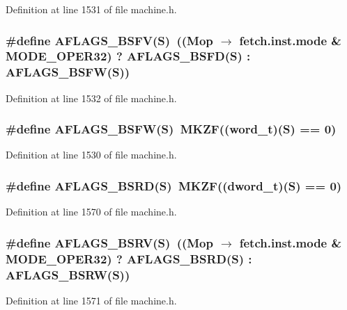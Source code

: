 Definition at line 1531 of file machine.h.
\subsubsection[{AFLAGS\_\-BSFV}]{\setlength{\rightskip}{0pt plus 5cm}\#define AFLAGS\_\-BSFV(S)~((Mop $\rightarrow$ fetch.inst.mode \& MODE\_\-OPER32) ? AFLAGS\_\-BSFD(S) : AFLAGS\_\-BSFW(S))}\label{machine_8h_4d539d031ac2b861096a1b2156a0d04d}




Definition at line 1532 of file machine.h.
\subsubsection[{AFLAGS\_\-BSFW}]{\setlength{\rightskip}{0pt plus 5cm}\#define AFLAGS\_\-BSFW(S)~MKZF(({\bf word\_\-t})(S) == 0)}\label{machine_8h_54241488b0e670cea13c4d2ce9f1f117}




Definition at line 1530 of file machine.h.
\subsubsection[{AFLAGS\_\-BSRD}]{\setlength{\rightskip}{0pt plus 5cm}\#define AFLAGS\_\-BSRD(S)~MKZF(({\bf dword\_\-t})(S) == 0)}\label{machine_8h_9987a04a1ac948f1a1ba7510d0451ef5}




Definition at line 1570 of file machine.h.
\subsubsection[{AFLAGS\_\-BSRV}]{\setlength{\rightskip}{0pt plus 5cm}\#define AFLAGS\_\-BSRV(S)~((Mop $\rightarrow$ fetch.inst.mode \& MODE\_\-OPER32) ? AFLAGS\_\-BSRD(S) : AFLAGS\_\-BSRW(S))}\label{machine_8h_29004d2699327f13becad18c16c3e8d1}




Definition at line 1571 of file machine.h.
